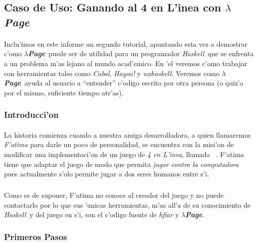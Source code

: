 \documentclass[a4paper]{article}
\newcommand{\haskell}{\textsl{Haskell}}
\newcommand{\hpage}{\textbf{\textsl{$\lambda$Page}}}
\newcommand{\cabal}{\textsl{Cabal}}
\begin{document}
\newpage
\subsection{Caso de Uso: Ganando al 4 en L'inea con \hpage}
\begin{epigraphs}
\end{epigraphs}
\paragraph{}Inclu'imos en este informe un segundo tutorial, apuntando esta vez a demostrar c'omo \hpage\ puede ser de utilidad para un programador \haskell\ que se enfrenta a un problema m'as lejano al mundo acad'emico.  En 'el veremos c'omo trabajar con herramientas tales como \cabal, \textsl{Hayoo!} y \textsl{wxhaskell}.  Veremos como \hpage\ ayuda al usuario a ``entender'' c'odigo escrito por otra persona (o quiz'a por el mismo, suficiente tiempo atr'as).
\subsubsection{Introducci'on}
\paragraph{}La historia comienza cuando a nuestra amiga desarrolladora, a quien llamaremos \textsl{F'atima} para darle un poco de personalidad, se encuentra con la misi'on de modificar una implementaci'on de un juego de \textsl{4 en L'inea}, llamada ~\cite{hfiar}.  F'atima tiene que adaptar el juego de modo que permita \textsl{jugar contra la computadora} pues actualmente s'olo permite jugar a dos seres humanos entre s'i.
\subparagraph{}Como es de suponer, F'atima no conoce al creador del juego y no puede contactarlo por lo que sus 'unicas herramientas, m'as all'a de su conocimiento de \haskell\ y del juego en s'i, son el c'odigo fuente de \textsl{hfiar} y \hpage.

\subsubsection{Primeros Pasos}
\end{document}
